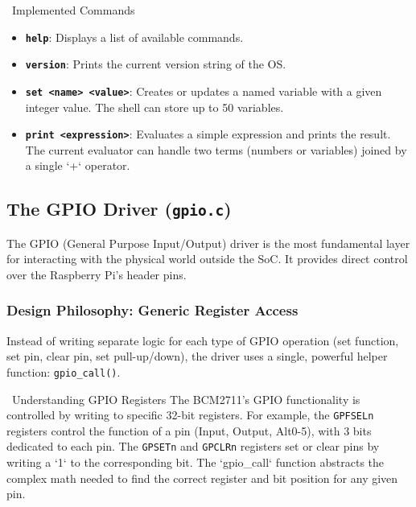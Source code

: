 \documentclass[a4paper, 11pt]{article}
\begin{document}
	\begin{infobox}{\faTerminal\ Implemented Commands}
		\begin{itemize}
			\item \textbf{\texttt{help}}: Displays a list of available commands.
			\item \textbf{\texttt{version}}: Prints the current version string of the OS.
			\item \textbf{\texttt{set <name> <value>}}: Creates or updates a named variable with a given integer value. The shell can store up to 50 variables.
			\item \textbf{\texttt{print <expression>}}: Evaluates a simple expression and prints the result. The current evaluator can handle two terms (numbers or variables) joined by a single `+` operator.
		\end{itemize}
	\end{infobox}
	
	\subsection{The GPIO Driver (\texttt{gpio.c})}
	The GPIO (General Purpose Input/Output) driver is the most fundamental layer for interacting with the physical world outside the SoC. It provides direct control over the Raspberry Pi's header pins.
	
	\subsubsection{Design Philosophy: Generic Register Access}
	Instead of writing separate logic for each type of GPIO operation (set function, set pin, clear pin, set pull-up/down), the driver uses a single, powerful helper function: \texttt{gpio\_call()}.
	
	\begin{warningbox}{\faCog\ Understanding GPIO Registers}
		The BCM2711's GPIO functionality is controlled by writing to specific 32-bit registers. For example, the \texttt{GPFSELn} registers control the function of a pin (Input, Output, Alt0-5), with 3 bits dedicated to each pin. The \texttt{GPSETn} and \texttt{GPCLRn} registers set or clear pins by writing a `1` to the corresponding bit. The `gpio\_call` function abstracts the complex math needed to find the correct register and bit position for any given pin.
	\end{warningbox}
	
\end{document}
